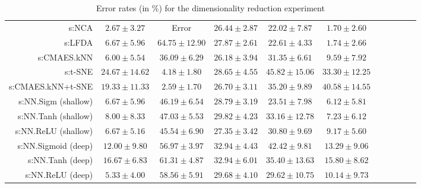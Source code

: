 \begin{table}[ht]
{\begin{tabular}{rcccccccccc}
s:NCA & $\bm{2.67\pm3.27}$ & Error  & $26.44\pm2.87$ & $\bm{22.02\pm7.87}$ & $\bm{1.70\pm2.60}$ \\
s:LFDA & $6.67\pm5.96$ & $64.75\pm12.90$ & $27.87\pm2.61$ & $22.61\pm4.33$ & $1.74\pm2.66$ \\
s:CMAES.kNN & $6.00\pm5.54$ & $36.09\pm6.29$ & $\bm{26.18\pm3.94}$ & $31.35\pm6.61$ & $9.59\pm7.92$ \\
s:t-SNE & $24.67\pm14.62$ & $4.18\pm1.80$ & $28.65\pm4.55$ & $45.82\pm15.06$ & $33.30\pm12.25$ \\
s:CMAES.kNN+t-SNE & $19.33\pm11.33$ & $\bm{2.59\pm1.70}$ & $26.70\pm3.11$ & $35.20\pm9.89$ & $40.58\pm14.55$ \\
s:NN.Sigm (shallow) & $6.67\pm5.96$ & $46.19\pm6.54$ & $28.79\pm3.19$ & $23.51\pm7.98$ & $6.12\pm5.81$ \\
s:NN.Tanh (shallow) & $8.00\pm8.33$ & $47.03\pm5.53$ & $29.82\pm4.23$ & $33.16\pm12.78$ & $7.23\pm6.12$ \\
s:NN.ReLU (shallow) & $6.67\pm5.16$ & $45.54\pm6.90$ & $27.35\pm3.42$ & $30.80\pm9.69$ & $9.17\pm5.60$ \\
s:NN.Sigmoid (deep) & $12.00\pm9.80$ & $56.97\pm3.97$ & $32.94\pm4.43$ & $42.42\pm9.81$ & $13.29\pm9.06$ \\
s:NN.Tanh (deep) & $16.67\pm6.83$ & $61.31\pm4.87$ & $32.94\pm6.01$ & $35.40\pm13.63$ & $15.80\pm8.62$ \\
s:NN.ReLU (deep) & $5.33\pm4.00$ & $58.56\pm5.91$ & $29.68\pm4.10$ & $29.62\pm10.75$ & $10.14\pm9.73$ \\


\bottomrule
\end{tabular}
}
\caption{Error rates (in \%) for the dimensionality reduction experiment} \label{tab:dim-error-rates}
\end{table}
